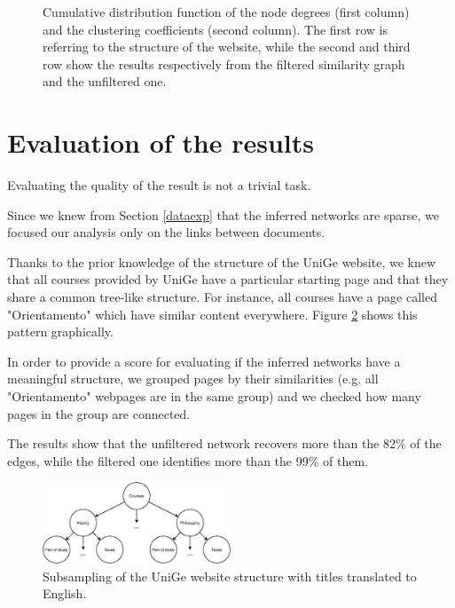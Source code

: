 \begin{figure}[ht]
    \caption{Cumulative distribution function of the node degrees (first column) 
    and the clustering coefficients (second column).
    The first row is referring to the structure of the website, while
    the second and third row show the results respectively from the filtered similarity graph and the unfiltered one.}
    \label{fig:exploration}
\end{figure}



\section{Evaluation of the results} \label{eval}

Evaluating the quality of the result is not a trivial task. 

Since we knew from Section \ref{dataexp} that the inferred networks are sparse, 
we focused our analysis only on the links between documents. 

Thanks to the prior knowledge of the structure of the UniGe website, we knew that 
all courses provided by UniGe have a particular starting page and that
they share a common tree-like structure. 
For instance, all courses have a page called "Orientamento" which have similar content everywhere. 
Figure \ref{fig:unige-structure} shows this pattern graphically.

In order to provide a score for evaluating if the inferred networks have a meaningful structure, 
we grouped pages by their similarities (e.g. all "Orientamento" webpages are in the same group) and 
we checked how many pages in the group are connected. 

The results show that the unfiltered network recovers more than the 82\% of the edges, 
while the filtered one identifies more than the 99\% of them. 

\begin{figure}[H]
    \centering
    \includegraphics[width=0.5\textwidth]{images/unige-structure.eps}
    \caption{Subsampling of the UniGe website structure with titles translated to English.}
    \label{fig:unige-structure}
\end{figure}



